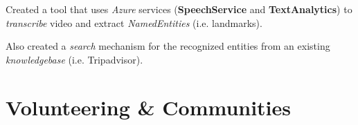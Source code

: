 \documentclass[]{openfont}
\begin{document}
\begin{minipage}[t]{0.65\textwidth}
    \begin{tightemize}
        \item Created a tool that uses \textit{Azure} services (\textbf{SpeechService} and \textbf{TextAnalytics}) to \textit{transcribe} video and extract \textit{NamedEntities} (i.e. landmarks).
        \item Also created a \textit{search} mechanism for the recognized entities from an existing \textit{knowledgebase}  (i.e. Tripadvisor).
    \end{tightemize}


    \section{Volunteering \& Communities}
    \textbullet{} 

    \textbullet{} 

    \textbullet{} 

    \sectionsep

\end{minipage}
\end{document}
